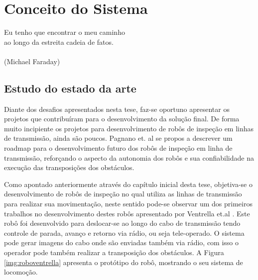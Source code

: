 \chapter{Conceito do Sistema}
\label{chap:concep}

%

\begin{flushright}
  Eu tenho que encontrar o meu caminho \\
  ao longo da estreita cadeia de fatos. \\
  \ \\
  (Michael Faraday)
\end{flushright}

\section{Estudo do estado da arte}
\label{sec:sota}
Diante dos desafios apresentados nesta tese, faz-se oportuno apresentar os projetos que contribuíram para o desenvolvimento da solução final. De forma muito incipiente os projetos para desenvolvimento de robôs de inspeção em linhas de transmissão, ainda são poucos. Pagnano et. al \cite{pagnano2013roadmap} se propos a descrever um roadmap para o desenvolvimento futuro dos robôs de inspeção em linha de transmissão, reforçando o aspecto da autonomia dos robôs e sua confiabilidade na execução das transposições dos obstáculos.

Como apontado anteriormente através do capítulo inicial desta tese, objetiva-se o desenvolvimento de robôs de inspeção no qual utiliza as linhas de transmissão para realizar sua movimentação, neste sentido pode-se observar um dos primeiros trabalhos no desenvolvimento destes robôs apresentado por Ventrella et.al \cite{ventrella2003robo}. Este robô foi desenvolvido para deslocar-se ao longo do cabo de transmissão tendo controle de parada, avanço e retorno via rádio, ou seja tele-operado. O sistema pode gerar imagens do cabo onde são enviadas também via rádio, com isso o operador pode também realizar a transposição dos obstáculos. A Figura \ref{img:roboventrella} apresenta o protótipo do robô, mostrando o seu sistema de locomoção.

